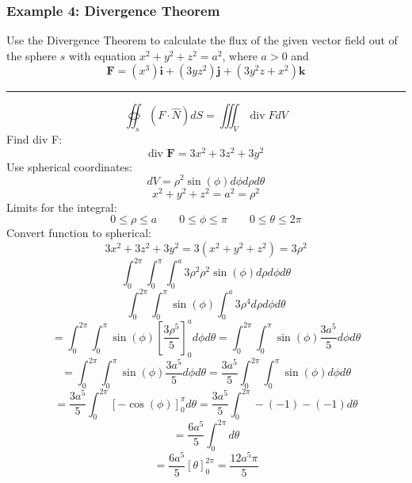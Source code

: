 \subsubsection{Example 4: Divergence Theorem}
Use the Divergence Theorem to calculate the flux of the given vector field out
of the sphere $s$ with equation $x^2 + y^2 + z^2 = a^2$, where $a > 0$ and
$$\mathbf{F}=(x^{3})\mathbf{i}+(3yz^{2})\mathbf{j}+(3y^2z+x^2)\mathbf{k}$$

\rule{\textwidth}{0.5pt}
$$\oiint_{s}(F \cdot \widehat{N}) d S=\iiint_V \operatorname{div} F d V$$
Find div F:
$$\text{div }\mathbf{F}=3x^2+3z^2+3y^2$$
Use spherical coordinates:
$$dV=\rho^2\sin(\phi)d\phi d\rho d\theta$$
$$x^2 + y^2 + z^2 = a^2=\rho^2$$
Limits for the integral:
$$0\leq \rho \leq a\qquad 0\leq\phi\leq \pi\qquad 0\leq\theta\leq 2\pi$$
Convert function to spherical:
$$3x^2+3z^2+3y^2=3(x^2+y^2+z^2)=3\rho^2$$
$$\int_0^{2\pi}\int_0^{\pi}\int_0^a3\rho^2\rho^2\sin(\phi)d\rho d\phi d\theta$$
$$\int_0^{2\pi}\int_0^{\pi}\sin(\phi)\int_0^a3\rho^4d\rho d\phi d\theta$$
$$=\int_0^{2\pi}\int_0^{\pi}\sin(\phi)\left[\frac{3\rho^5}{5} \right]_0^ad\phi d\theta=\int_0^{2\pi}\int_0^{\pi}\sin(\phi)\frac{3a^5}{5}d\phi d\theta$$
$$=\int_0^{2\pi}\int_0^{\pi}\sin(\phi)\frac{3a^5}{5}d\phi d\theta=\frac{3a^5}{5}\int_0^{2\pi}\int_0^{\pi}\sin(\phi)d\phi d\theta$$
$$=\frac{3a^5}{5}\int_0^{2\pi}\left[-\cos(\phi)\right]_0^\pi d\theta=\frac{3a^5}{5}\int_0^{2\pi}-(-1)-(-1) d\theta$$
$$=\frac{6a^5}{5}\int_0^{2\pi} d\theta$$
$$=\frac{6a^5}{5}\left[\theta\right]_0^{2\pi}=\frac{12a^5\pi}{5}$$
